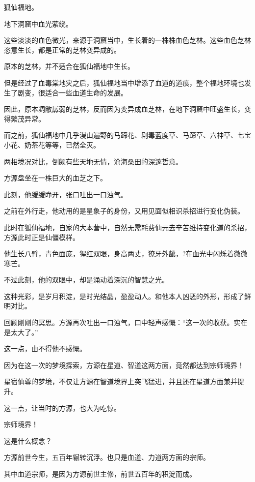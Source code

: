 
\begin{this_body}

狐仙福地。

地下洞窟中血光萦绕。

这些淡淡的血色微光，来源于洞窟当中，生长着的一株株血色芝林。这些血色芝林恣意生长，都是正常的芝林变异成的。

原本的芝林，并不适合在狐仙福地中生长。

但是经过了血毒棠地灾之后，狐仙福地当中增添了血道的道痕，整个福地环境也发生了剧变，很适合一些血道生命的发展。

因此，原本凋敝孱弱的芝林，反而因为变异成血芝林，在地下洞窟中旺盛生长，变得繁茂异常。

而之前，狐仙福地中几乎漫山遍野的马蹄花、剧毒蓝度草、马蹄草、六神草、七宝小花、奶茶花等等，已然全灭。

两相境况对比，倒颇有些天地无情，沧海桑田的深邃哲意。

方源盘坐在一株巨大的血芝之下。

此刻，他缓缓睁开，张口吐出一口浊气。

之前在外行走，他动用的是星象子的身份，又用见面似相识杀招进行变化伪装。

此时在狐仙福地，自家的大本营中，自然无需耗费仙元去辛苦维持变化道的杀招，方源此时正是仙僵模样。

他生长八臂，青色面庞，猩红双眼，身高两丈，獠牙外龇，?在血光中闪烁着微微寒芒。

不过此刻，他的双眼中，却是涌动着深沉的智慧之光。

这种光彩，是岁月积淀，是时光结晶，盈盈动人。和他本人凶恶的外形，形成了鲜明对比。

回顾刚刚的冥思。方源再次吐出一口浊气，口中轻声感慨：“这一次的收获。实在是太大了。”

这一点，由不得他不感慨。

因为在这一次的梦境探索，方源在星道、智道这两方面，竟然都达到宗师境界！

星宿仙尊的梦境，不仅让方源在智道境界上突飞猛进，并且还在星道方面兼并提升。

这一点，让当时的方源，也大为吃惊。

宗师境界！

这是什么概念？

方源前世今生，五百年辗转沉浮。也只是血道、力道两方面的宗师。

其中血道宗师，是因为方源前世主修，前世五百年的积淀而成。


\end{this_body}
